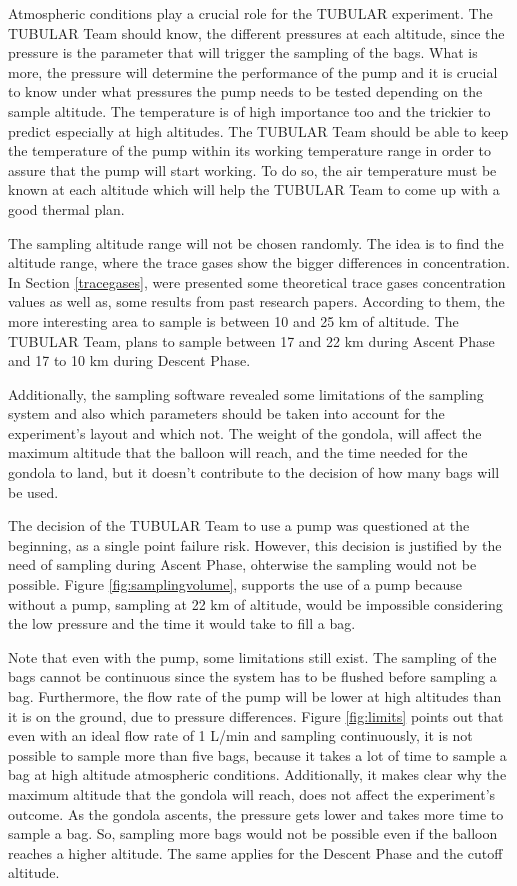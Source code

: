 Atmospheric conditions play a crucial role for the TUBULAR experiment. The TUBULAR Team should know, the different pressures at each altitude, since the pressure is the parameter that will trigger the sampling of the bags. What is more, the pressure will determine the performance of the pump and it is crucial to know under what pressures the pump needs to be tested depending on the sample altitude. The temperature is of high importance too and the trickier to predict especially at high altitudes. The TUBULAR Team should be able to keep the temperature of the pump within its working temperature range in order to assure that the pump will start working. To do so, the air temperature must be known at each altitude which will help the TUBULAR Team to come up with a good thermal plan. 

The sampling altitude range will not be chosen randomly. The idea is to find the altitude range, where the trace gases show the bigger differences in concentration. In Section \ref{tracegases}, were presented some theoretical trace gases concentration values as well as, some results from past research papers. According to them, the more interesting area to sample is between 10 and 25 km of altitude. The TUBULAR Team, plans to sample between 17 and 22 km during Ascent Phase and 17 to 10 km during Descent Phase. 

Additionally, the sampling software revealed some limitations of the sampling system and also which parameters should be taken into account for the experiment's layout and which not. 
The weight of the gondola, will affect the maximum altitude that the balloon will reach, and the time needed for the gondola to land, but it doesn't contribute to the decision of how many bags will be used.

The decision of the TUBULAR Team to use a pump was questioned at the beginning, as a single point failure risk. However, this decision is justified by the need of sampling during Ascent Phase, ohterwise the sampling would not be possible.  Figure \ref{fig:samplingvolume}, supports the use of a pump because without a pump, sampling at 22 km of altitude, would be impossible considering the low pressure and the time it would take to fill a bag. 

Note that even with the pump, some limitations still exist. The sampling of the bags cannot be continuous since the system has to be flushed before sampling a bag. Furthermore, the flow rate of the pump will be lower at high altitudes than it is on the ground, due to pressure differences. Figure \ref{fig:limits} points out that even with an ideal flow rate of 1 L/min and sampling continuously, it is not possible to sample more than five bags, because it takes a lot of time to sample a bag at high altitude atmospheric conditions. Additionally, it makes clear why the maximum altitude that the gondola will reach, does not affect the experiment's outcome. As the gondola ascents, the pressure gets lower and takes more time to sample a bag. So, sampling more bags would not be possible even if the balloon reaches a higher altitude. The same applies for the Descent Phase and the cutoff altitude. 

